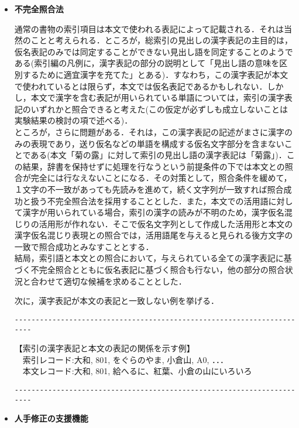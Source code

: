 \begin{itemize}
\item {\bf 不完全照合法}

通常の書物の索引項目は本文で使われる表記によって記載される．それは当然のことと考えられる．ところが，総索引の見出しの漢字表記の主目的は，仮名表記のみでは同定することができない見出し語を同定することのようである(索引編の凡例\cite{NIKKI1996}に，漢字表記の部分の説明として「見出し語の意味を区別するために適宜漢字を充てた」とある)．すなわち，この漢字表記が本文で使われているとは限らず，本文では仮名表記であるかもしれない．しかし，本文で漢字を含む表記が用いられている単語については，索引の漢字表記のいずれかと照合できると考えた(この仮定が必ずしも成立しないことは実験結果の検討の項で述べる)．
\\
ところが，さらに問題がある．それは，この漢字表記の記述がまさに漢字のみの表現であり，送り仮名などの単語を構成する仮名文字部分を含まないことである(本文「菊の露」に対して索引の見出し語の漢字表記は「菊露」)．この結果，辞書を保持せずに処理を行なうという前提条件の下では本文との照合が完全には行なえないことになる．その対策として，照合条件を緩めて，１文字の不一致があっても先読みを進めて，続く文字列が一致すれば照合成功と扱う不完全照合法を採用することとした．また，本文での活用語に対して漢字が用いられている場合，索引の漢字の読みが不明のため，漢字仮名混じりの活用形が作れない．そこで仮名文字列として作成した活用形と本文の漢字仮名混じり表現との照合では，活用語尾を与えると見られる後方文字の一致で照合成功とみなすこととする．
\\
結局，索引語と本文との照合において，与えられている全ての漢字表記に基づく不完全照合とともに仮名表記に基づく照合も行ない，他の部分の照合状況と合わせて適切な候補を求めることとした．

次に，漢字表記が本文の表記と一致しない例を挙げる．

\begin{verbatim}
-----------------------------------------------------------------------
\end{verbatim}
【索引の漢字表記と本文の表記の関係を示す例】
\\
　索引レコード:大和, 801, をぐらのやま, 小倉山, A0, ．．．
\\
　本文レコード:大和, 801, 給へるに、紅葉、小倉の山にいろいろ　　

\begin{verbatim}
-----------------------------------------------------------------------
\end{verbatim}

\item {\bf 人手修正の支援機能}


\end{itemize}
